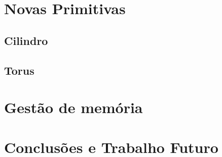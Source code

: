 \documentclass[a4paper]{article}
\begin{document}
\section{Novas Primitivas}

\subsection{Cilindro}

\subsection{Torus}

\section{Gestão de memória}

\section{Conclusões e Trabalho Futuro}
\end{document}
